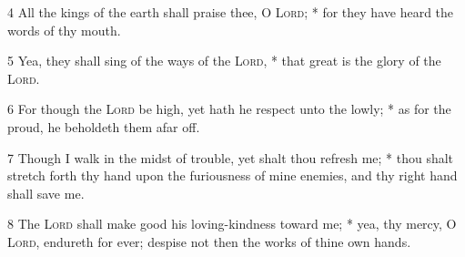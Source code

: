 4 All the kings of the earth shall praise thee, O {\textsc{Lord}}; * for they have heard the words of thy mouth.\par
5 Yea, they shall sing of the ways of the {\textsc{Lord}}, * that great is the glory of the {\textsc{Lord}}.\par
6 For though the {\textsc{Lord}} be high, yet hath he respect unto the lowly; * as for the proud, he beholdeth them afar off.\par
7 Though I walk in the midst of trouble, yet shalt thou refresh me; * thou shalt stretch forth thy hand upon the furiousness of mine enemies, and thy right hand shall save me.\par
8 The {\textsc{Lord}} shall make good his loving-kindness toward me; * yea, thy mercy, O {\textsc{Lord}}, endureth for ever; despise not then the works of thine own hands.

